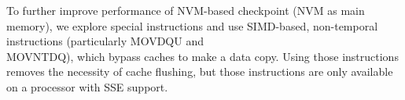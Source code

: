 \begin{comment}
The following is copied from here (https://software.intel.com/en-us/forums/software-tuning-performance-optimization-platform-monitoring/topic/699950)

The overhead of CLFLUSH is generally quite low -- it requires at least one issue slot to a read/write port, and may require additional micro-ops.  This is one of the few instructions that Agner Fog does not track in his (otherwise) comprehensive collection of performance data at http://www.agner.org/optimize/instruction_tables.pdf.    The CLFLUSH instruction is required to remove the cache line from *all* processor caches in the entire system, so it will require many of the same resources that are used to track a store that misses in all levels of the cache.  If these resources are already busy, then the CLFLUSH may extend the overall program execution time, but the effect is indirect and difficult to quantify.
\end{comment}

\begin{comment}
To further improve performance of cache flushing, we explore the usage of  {\fontfamily{qcr}\selectfont CLWB}, and replace {\fontfamily{qcr}\selectfont clflush} with {\fontfamily{qcr}\selectfont CLWB}. {\fontfamily{qcr}\selectfont CLWB} is a very recent x86 instruction with few documentation available on which processor supports it. We cannot find any processor supporting it. Hence, we use an emulation approach to quantify its effect on cache flushing.
In particular, instead of {\fontfamily{qcr}\selectfont clflush}ing the cache blocks of checkpointed data objects, we {\fontfamily{qcr}\selectfont clflush} a cache line with dummy data. 
To minimize the impact of this cache line on the cache occupancy, we repeatedly flush the same cache line for each  {\fontfamily{qcr}\selectfont clflush}. 
Based on this emulation approach, the cache blocks of checkpointed data objects are evicted out of the cache hierarchy. Meanwhile we can emulate the overhead of data write-back into the main memory.
\end{comment}

To further improve performance of NVM-based checkpoint (NVM as main memory), 
we explore special instructions and use SIMD-based, non-temporal instructions (particularly MOVDQU and \\MOVNTDQ), which bypass caches
to make a data copy. Using those instructions removes the necessity of cache flushing, but those instructions are only available on
a processor with SSE support. %

